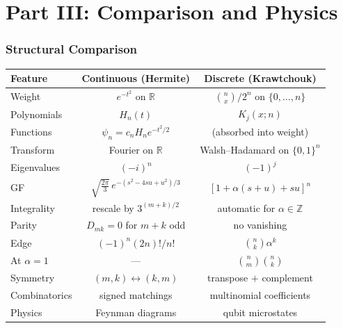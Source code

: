 \documentclass[11pt,a4paper]{article}
\theoremstyle{plain}
\theoremstyle{definition}
\newcommand{\R}{\mathbb{R}}
\newcommand{\Z}{\mathbb{Z}}
\begin{document}

\part*{Part III: Comparison and Physics}

\section{Structural Comparison}

\begin{tcolorbox}[breakable, colback=yellow!10, colframe=yellow!10,
  boxrule=0pt, sharp corners]
\begin{center}
\renewcommand{\arraystretch}{1.5}
\begin{tabular}{lcc}
  \toprule
  Feature & Continuous (Hermite) & Discrete (Krawtchouk) \\
  \midrule
  Weight & $e^{-t^2}$ on $\R$ & $\binom{n}{x}/2^n$ on $\{0,\ldots,n\}$ \\
  Polynomials & $H_n(t)$ & $K_j(x;n)$ \\
  Functions & $\psi_n = c_n H_n e^{-t^2/2}$ & (absorbed into weight) \\
  Transform & Fourier on $\R$ & Walsh--Hadamard on $\{0,1\}^n$ \\
  Eigenvalues & $(-i)^n$ & $(-1)^j$ \\[4pt]
  GF &
    $\sqrt{\tfrac{2\pi}{3}}\,e^{-(s^2-4su+u^2)/3}$
    & $[1 + \alpha(s{+}u) + su]^n$ \\[4pt]
  Integrality & rescale by $3^{(m+k)/2}$ & automatic for $\alpha \in \Z$ \\
  Parity & $D_{mk}=0$ for $m{+}k$ odd & no vanishing \\
  Edge & $(-1)^n(2n)!/n!$ & $\binom{n}{k}\alpha^k$ \\
  At $\alpha=1$ & --- & $\binom{n}{m}\binom{n}{k}$ \\
  Symmetry & $(m,k) \leftrightarrow (k,m)$
    & transpose $+$ complement \\
  Combinatorics & signed matchings & multinomial coefficients \\
  Physics & Feynman diagrams & qubit microstates \\
  \bottomrule
\end{tabular}
\end{center}
\end{tcolorbox}
\end{document}
